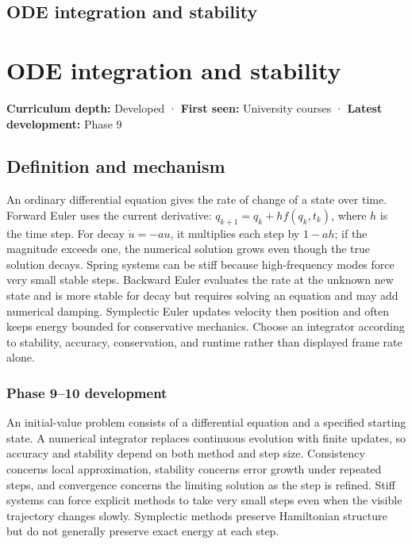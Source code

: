 \hypertarget{appendix-18eacf61a04b}{}
\section*{ODE integration and stability}
\chapter{ODE integration and stability}\label{appendix-18eacf61a04b-ode-integration-and-stability}

\textbf{Curriculum depth:} Developed · \textbf{First seen:} University courses · \textbf{Latest development:} Phase 9

\section{Definition and mechanism}\label{appendix-18eacf61a04b-definition-and-mechanism}

An ordinary differential equation gives the rate of change of a state over time. Forward Euler uses the current derivative: \(q_{k+1}=q_k+h f(q_k,t_k)\), where \(h\) is the time step. For decay \(\dot u=-au\), it multiplies each step by \(1-ah\); if the magnitude exceeds one, the numerical solution grows even though the true solution decays. Spring systems can be stiff because high-frequency modes force very small stable steps. Backward Euler evaluates the rate at the unknown new state and is more stable for decay but requires solving an equation and may add numerical damping. Symplectic Euler updates velocity then position and often keeps energy bounded for conservative mechanics. Choose an integrator according to stability, accuracy, conservation, and runtime rather than displayed frame rate alone.

\subsection{Phase 9--10 development}\label{appendix-18eacf61a04b-phase-910-development}

An initial-value problem consists of a differential equation and a specified starting state. A numerical integrator replaces continuous evolution with finite updates, so accuracy and stability depend on both method and step size. Consistency concerns local approximation, stability concerns error growth under repeated steps, and convergence concerns the limiting solution as the step is refined. Stiff systems can force explicit methods to take very small steps even when the visible trajectory changes slowly. Symplectic methods preserve Hamiltonian structure but do not generally preserve exact energy at each step.

